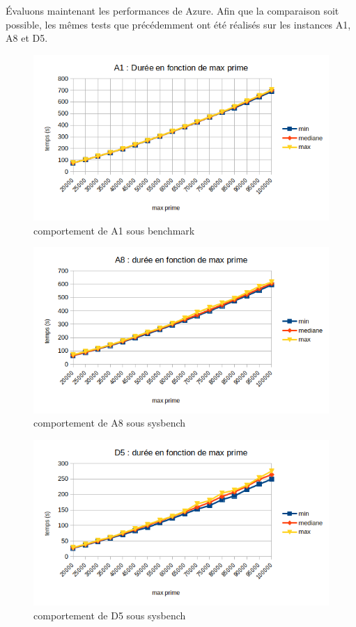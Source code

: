 \documentclass[11pt]{article}
\begin{document}
Évaluons maintenant les performances de Azure. Afin que la comparaison soit possible, les mêmes tests que précédemment ont été réalisés sur les instances A1, A8 et D5.

\begin{figure}
\centering
\includegraphics[width=0.9\linewidth]{images/cupA1RAW}
\caption{comportement de A1 sous benchmark}
\label{fig:cupa1raw}
\end{figure}

\begin{figure}
\centering
\includegraphics[width=0.9\linewidth]{images/cpuA8RAW}
\caption{comportement de A8 sous sysbench}
\label{fig:cpua8raw}
\end{figure}

\begin{figure}
\centering
\includegraphics[width=0.9\linewidth]{images/cpuD5RAW}
\caption{comportement de D5 sous sysbench}
\label{fig:cpud5raw}
\end{figure}
\end{document}
